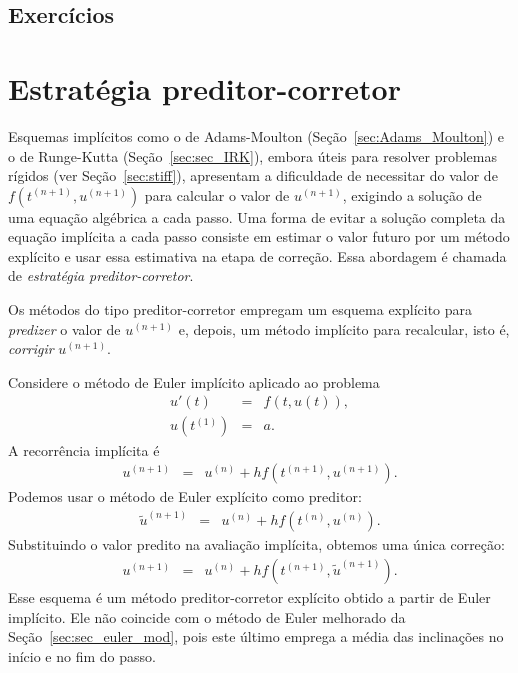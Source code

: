\construirExeresol

\subsection*{Exercícios}

\construirExer

\section{Estratégia preditor-corretor}
Esquemas implícitos como o de Adams-Moulton (Seção~\ref{sec:Adams_Moulton}) e o de Runge-Kutta (Seção~\ref{sec:sec_IRK}), embora úteis para resolver problemas rígidos (ver Seção~\ref{sec:stiff}), apresentam a dificuldade de necessitar do valor de $f(t^{(n+1)},u^{(n+1)})$ para calcular o valor de $u^{(n+1)}$, exigindo a solução de uma equação algébrica a cada passo. Uma forma de evitar a solução completa da equação implícita a cada passo consiste em estimar o valor futuro por um método explícito e usar essa estimativa na etapa de correção. Essa abordagem é chamada de \emph{estratégia preditor-corretor}.

Os métodos do tipo preditor-corretor empregam um esquema explícito para \emph{predizer} o valor de $u^{(n+1)}$ e, depois, um método implícito para recalcular, isto é, \emph{corrigir} $u^{(n+1)}$.

\begin{ex}
Considere o método de Euler implícito aplicado ao problema
\begin{eqnarray}
u'(t)&=&f(t,u(t)),\\
u(t^{(1)})&=&a.
\end{eqnarray}
A recorrência implícita é
\begin{eqnarray}
u^{(n+1)}&=&u^{(n)}+hf(t^{(n+1)},u^{(n+1)}).
\end{eqnarray}
Podemos usar o método de Euler explícito como preditor:
\begin{eqnarray}
\tilde{u}^{(n+1)}&=&u^{(n)}+hf(t^{(n)},u^{(n)}).
\end{eqnarray}
Substituindo o valor predito na avaliação implícita, obtemos uma única correção:
\begin{eqnarray}
u^{(n+1)}&=&u^{(n)}+hf(t^{(n+1)},\tilde{u}^{(n+1)}).
\end{eqnarray}
Esse esquema é um método preditor-corretor explícito obtido a partir de Euler implícito. Ele não coincide com o método de Euler melhorado da Seção~\ref{sec:sec_euler_mod}, pois este último emprega a média das inclinações no início e no fim do passo.
\end{ex}


